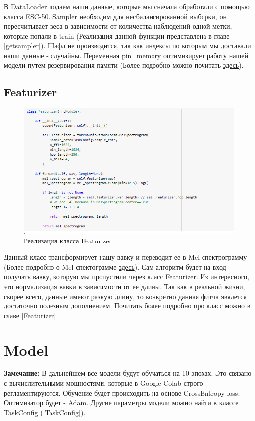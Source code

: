 \documentclass[a4paper,12pt]{article}
\begin{document}
 	В DataLoader подаем наши данные, которые мы сначала обработали с помощью класса ESC-50. Sampler необходим для несбалансированной выборки, он пересчитывает веса в зависимости от количества наблюдений одной метки, которые попали в train (Реализация данной функции представлена в главе \ref{getsampler}).
 	Шафл не производится, так как индексы по которым мы доставали наши данные - случайны. Переменная pin\_memory оптимизирует работу нашей модели путем резервирования памяти (Более подробно можно почитать \href{https://medium.com/deelvin-machine-learning/pytorch-performance-tuning-in-action-7c4d065d4278}{здесь}).
	\subsection{Featurizer}
		\begin{figure}[H]
			\centering
			\includegraphics[width=0.7\linewidth]{Image/Featurizer}
			\caption{Реализация класса Featurizer}
			\label{fig:featurizer}
		\end{figure}
		Данный класс трансформирует нашу вавку и переводит ее в Mel-спектрограмму (Более подробно о Mel-спектограмме \href{https://medium.com/analytics-vidhya/understanding-the-mel-spectrogram-fca2afa2ce53}{здесь}). Сам алгоритм будет на вход получать вавку, которую мы пропустили через класс Featurizer. Из интересного, это нормализация вавки в зависимости от ее длины. Так как в реальной жизни, скорее всего, данные имеют разную длину, то конкретно данная фитча явялется достаточно полезным дополнением. Почитать более подробно про класс можно в главе \ref{Featurizer}
		
	
		 	
\section{Model}

\textbf{Замечание:} В дальнейшем все модели будут обучаться на 10 эпохах. Это связано с вычислительными мощностями, которые в Google Colab строго регламентируются. Обучение будет происходить на основе CrossEntropy loss. Оптимизатор будет - Adam. Другие параметры модели можно найти в классе TaskConfig (\ref{TaskConfig}).
\end{document}
